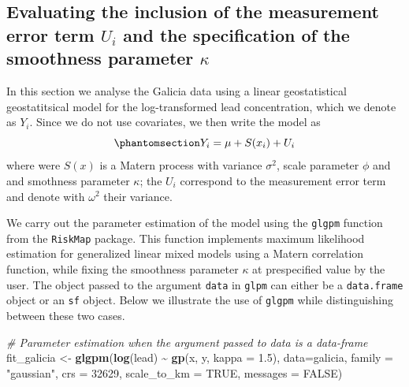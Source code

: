 \documentclass[
  letterpaper,
]{krantz}
\newenvironment{Shaded}{\begin{snugshade}}{\end{snugshade}}
\newcommand{\AttributeTok}[1]{\textcolor[rgb]{0.13,0.29,0.53}{#1}}
\newcommand{\CommentTok}[1]{\textcolor[rgb]{0.56,0.35,0.01}{\textit{#1}}}
\newcommand{\ConstantTok}[1]{\textcolor[rgb]{0.56,0.35,0.01}{#1}}
\newcommand{\DecValTok}[1]{\textcolor[rgb]{0.00,0.00,0.81}{#1}}
\newcommand{\FloatTok}[1]{\textcolor[rgb]{0.00,0.00,0.81}{#1}}
\newcommand{\FunctionTok}[1]{\textcolor[rgb]{0.13,0.29,0.53}{\textbf{#1}}}
\newcommand{\NormalTok}[1]{#1}
\newcommand{\OtherTok}[1]{\textcolor[rgb]{0.56,0.35,0.01}{#1}}
\newcommand{\SpecialCharTok}[1]{\textcolor[rgb]{0.81,0.36,0.00}{\textbf{#1}}}
\newcommand{\StringTok}[1]{\textcolor[rgb]{0.31,0.60,0.02}{#1}}
\begin{document}
\subsection{\texorpdfstring{Evaluating the inclusion of the measurement
error term \(U_i\) and the specification of the smoothness parameter
\(\kappa\)}{Evaluating the inclusion of the measurement error term U\_i and the specification of the smoothness parameter \textbackslash kappa}}\label{sec-glm-parest}

In this section we analyse the Galicia data using a linear
geostatistical geostatitsical model for the log-transformed lead
concentration, which we denote as \(Y_i\). Since we do not use
covariates, we then write the model as
\begin{equation}\phantomsection\label{eq-galicia-lgm}{
Y_i = \mu + S(x_i) + U_i
}\end{equation} where were \(S(x)\) is a Matern process with variance
\(\sigma^2\), scale parameter \(\phi\) and and smothness parameter
\(\kappa\); the \(U_i\) correspond to the measurement error term and
denote with \(\omega^2\) their variance.

We carry out the parameter estimation of the model using the
\texttt{glgpm} function from the \texttt{RiskMap} package. This function
implements maximum likelihood estimation for generalized linear mixed
models using a Matern correlation function, while fixing the smoothness
parameter \(\kappa\) at prespecified value by the user. The object
passed to the argument \texttt{data} in \texttt{glpm} can either be a
\texttt{data.frame} object or an \texttt{sf} object. Below we illustrate
the use of \texttt{glgpm} while distinguishing between these two cases.

\begin{Shaded}
\begin{Highlighting}[]
\CommentTok{\# Parameter estimation when the argument passed to \textasciigrave{}data\textasciigrave{} is a data{-}frame}
\NormalTok{fit\_galicia }\OtherTok{\textless{}{-}} 
\FunctionTok{glgpm}\NormalTok{(}\FunctionTok{log}\NormalTok{(lead) }\SpecialCharTok{\textasciitilde{}} \FunctionTok{gp}\NormalTok{(x, y, }\AttributeTok{kappa =} \FloatTok{1.5}\NormalTok{), }\AttributeTok{data=}\NormalTok{galicia, }\AttributeTok{family =} \StringTok{"gaussian"}\NormalTok{,}
      \AttributeTok{crs =} \DecValTok{32629}\NormalTok{, }\AttributeTok{scale\_to\_km =} \ConstantTok{TRUE}\NormalTok{, }\AttributeTok{messages =} \ConstantTok{FALSE}\NormalTok{)}
\end{Highlighting}
\end{Shaded}
\end{document}
